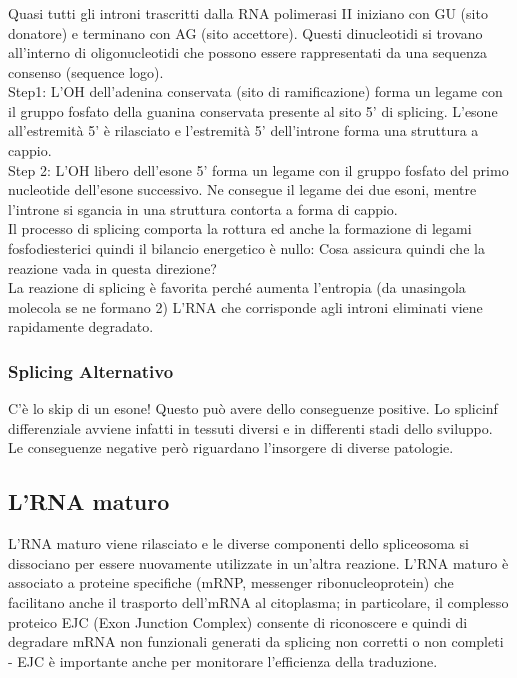 \documentclass{article}
\begin{document}
\subsubsection*{}
Quasi tutti gli introni trascritti dalla RNA polimerasi II iniziano con GU (sito donatore) e terminano con AG (sito accettore). Questi dinucleotidi si trovano all'interno di oligonucleotidi che possono essere
rappresentati da una sequenza consenso (sequence logo).\\
Step1: L'OH dell'adenina conservata (sito di ramificazione) forma un
legame con il gruppo fosfato della guanina conservata presente al sito 5'
di splicing. L'esone all'estremità 5' è rilasciato e l'estremità 5'
dell'introne forma una struttura a cappio.\\
Step 2: L'OH libero dell'esone 5' forma un legame con il gruppo fosfato
del primo nucleotide dell'esone successivo. Ne consegue il legame dei
due esoni, mentre l'introne si sgancia in una struttura contorta a forma
di cappio.\\
Il processo di splicing comporta la rottura ed anche la formazione di legami fosfodiesterici quindi il bilancio
energetico è nullo: Cosa assicura quindi che la reazione vada in questa direzione?\\
La reazione di splicing è favorita perché aumenta l'entropia (da unasingola molecola se ne formano 2)
L'RNA che corrisponde agli introni eliminati viene rapidamente degradato.
\subsubsection{Splicing Alternativo}
C'è lo skip di un esone! Questo può avere dello conseguenze positive.
Lo splicinf differenziale avviene infatti in tessuti diversi e in differenti stadi dello sviluppo.\\
Le conseguenze negative però riguardano l'insorgere di diverse patologie.
\subsection{L'RNA maturo}
L'RNA maturo viene rilasciato e le diverse componenti dello spliceosoma si dissociano per essere
nuovamente utilizzate in un'altra reazione.
L'RNA maturo è associato a proteine specifiche (mRNP, messenger ribonucleoprotein) che facilitano
anche il trasporto dell'mRNA al citoplasma; in particolare, il complesso proteico EJC (Exon Junction Complex) consente di riconoscere e quindi di
degradare mRNA non funzionali generati da splicing non corretti o non completi - EJC è importante anche per monitorare l'efficienza della traduzione.
\end{document}
